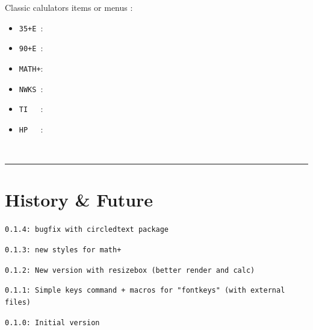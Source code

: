 \documentclass[11pt,a4paper]{ltxdoc}
\begin{document}
\begin{tcolorbox}[colframe=lightgray,colback=lightgray!5]
Classic calulators items or menus :

\begin{itemize}
	\item \texttt{35+E~}: 
	\item \texttt{90+E~}: 
	\item \texttt{MATH+}: 
	\item \texttt{NWKS~}: 
	\item \texttt{TI~~~}: 
	\item \texttt{HP~~~}: 
\end{itemize}
\end{tcolorbox}

\vfill~

\hrule

\vspace*{5mm}

\pagebreak


\hypertarget{matoc}{}

\tableofcontents

\vspace*{5mm}

\vfill

\section{History \& Future}

\texttt{0.1.4: bugfix with circledtext package}

\texttt{0.1.3: new styles for math+}

\texttt{0.1.2: New version with resizebox (better render and calc)}

\texttt{0.1.1: Simple keys command + macros for "fontkeys" (with external files)}

\texttt{0.1.0: Initial version}

\vspace*{5mm}


\pagebreak
\end{document}
